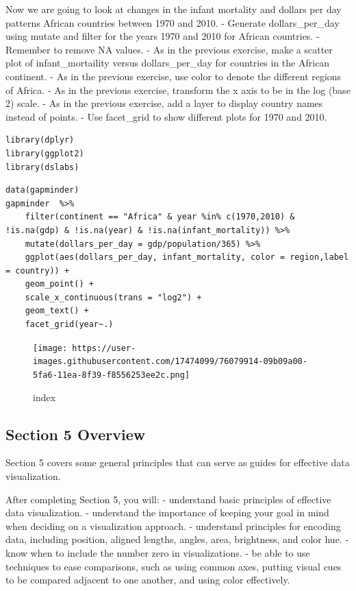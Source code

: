 \documentclass[
]{article}
\begin{document}
Now we are going to look at changes in the infant mortality and dollars
per day patterns African countries between 1970 and 2010. - Generate
dollars\_per\_day using mutate and filter for the years 1970 and 2010
for African countries. - Remember to remove NA values. - As in the
previous exercise, make a scatter plot of infant\_mortaility versus
dollars\_per\_day for countries in the African continent. - As in the
previous exercise, use color to denote the different regions of Africa.
- As in the previous exercise, transform the x axis to be in the log
(base 2) scale. - As in the previous exercise, add a layer to display
country names instead of points. - Use facet\_grid to show different
plots for 1970 and 2010.

\begin{verbatim}
library(dplyr)
library(ggplot2)
library(dslabs)
\end{verbatim}

\begin{verbatim}
data(gapminder)
gapminder  %>%
    filter(continent == "Africa" & year %in% c(1970,2010) & !is.na(gdp) & !is.na(year) & !is.na(infant_mortality)) %>%
    mutate(dollars_per_day = gdp/population/365) %>%
    ggplot(aes(dollars_per_day, infant_mortality, color = region,label = country)) +
    geom_point() +
    scale_x_continuous(trans = "log2") +
    geom_text() +
    facet_grid(year~.)
\end{verbatim}

\begin{figure}
\centering
\texttt{[image: https://user-images.githubusercontent.com/17474099/76079914-09b09a00-5fa6-11ea-8f39-f8556253ee2c.png]}
\caption{index}
\end{figure}

\hypertarget{section-5-overview}{%
\subsection{Section 5 Overview}\label{section-5-overview}}

Section 5 covers some general principles that can serve as guides for
effective data visualization.

After completing Section 5, you will: - understand basic principles of
effective data visualization. - understand the importance of keeping
your goal in mind when deciding on a visualization approach. -
understand principles for encoding data, including position, aligned
lengths, angles, area, brightness, and color hue. - know when to include
the number zero in visualizations. - be able to use techniques to ease
comparisons, such as using common axes, putting visual cues to be
compared adjacent to one another, and using color effectively.
\end{document}
